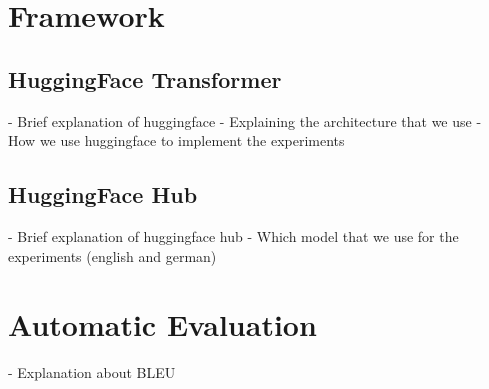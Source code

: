 \section{Framework}
\label{sec:framework}
\subsection{HuggingFace Transformer}
- Brief explanation of huggingface
- Explaining the architecture that we use
- How we use huggingface to implement the experiments

\subsection{HuggingFace Hub}
- Brief explanation of huggingface hub
- Which model that we use for the experiments (english and german)

\section{Automatic Evaluation}
\label{sec:aeval}
- Explanation about BLEU

